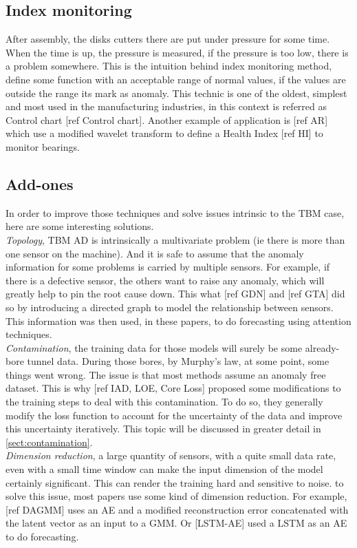 \documentclass[../../main/main.tex]{subfiles}
\begin{document}
    \subsection{Index monitoring}\label{subsec:indexing}
        After assembly, the disks cutters there are put under pressure for some time. When the time is up, the 
        pressure is measured, if the pressure is too low, there is a problem somewhere. This is the intuition behind index 
        monitoring method, define some function with an acceptable range of normal values, if the values are outside the range 
        its mark as anomaly. This technic is one of the oldest, simplest and most used in the manufacturing industries, in
        this context is referred as Control chart [ref Control chart]. Another example of application is [ref AR] which 
        use a modified wavelet transform to define a Health Index [ref HI] to monitor bearings. 
    
    \subsection{Add-ones}\label{subsec:add_ons}
        In order to improve those techniques and solve issues intrinsic to the TBM case, here are some interesting solutions.\\
        \textit{Topology}, TBM AD is intrinsically a multivariate problem (ie there is more than one sensor on the machine).
        And it is safe to assume that the anomaly information for some problems is carried by multiple sensors. For example, if there 
        is a defective sensor, the others want to raise any anomaly, which will greatly help to pin the root cause down. This what 
        [ref GDN] and [ref GTA] did so by introducing a directed graph to model the relationship between sensors. This information 
        was then used, in these papers, to do forecasting using attention techniques.\\
        
        \textit{Contamination}, the training data for those models will surely be some already-bore tunnel data. 
        During those bores, by Murphy's law, at some point, some things went wrong. The issue is that most methods assume an anomaly
        free dataset. This is why [ref IAD, LOE, Core Loss] proposed some modifications to the training steps to deal with this 
        contamination. To do so, they generally modify the loss function to account for the uncertainty of the data and improve 
        this uncertainty iteratively. This topic will be discussed in greater detail in \ref{sect:contamination}.\\
    
        \textit{Dimension reduction}, a large quantity of sensors, with a quite small data rate, even with a small time window
        can make the input dimension of the model certainly significant. This can render the training hard and sensitive to noise. 
        to solve this issue, most papers use some kind of dimension reduction. For example, [ref DAGMM] uses an AE and 
        a modified reconstruction error concatenated with the latent vector as an input to a GMM. Or [LSTM-AE] used a \ac{LSTM} as
        an AE to do forecasting.

        
    
\end{document}
